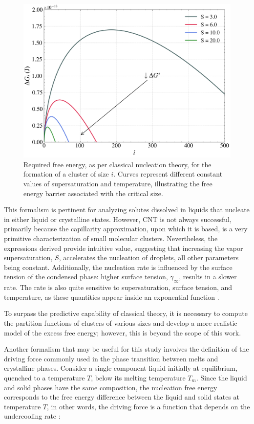 \begin{figure}[H]
    \centering
    \includegraphics[width=0.9\linewidth]{free_energy_illustrative_degree_saturation.png}
    \caption{Required free energy, as per classical nucleation theory, for the formation of a cluster of size \(i\). Curves represent different constant values of supersaturation and temperature, illustrating the free energy barrier associated with the critical size.}
    \label{fig:free_energy_illustrative_degree_saturation}
\end{figure}

This formalism is pertinent for analyzing solutes dissolved in liquids that nucleate in either liquid or crystalline states. However, CNT is not 
always successful, primarily because the capillarity approximation, upon which it is based, is a very primitive characterization of small molecular clusters. 
Nevertheless, the expressions derived provide intuitive value, suggesting that increasing the vapor supersaturation, \(S\), accelerates the nucleation of droplets, 
all other parameters being constant. Additionally, the nucleation rate is influenced by the surface tension of the condensed phase: higher surface 
tension, \(\gamma_{\infty}\), results in a slower rate. The rate is also quite sensitive to supersaturation, surface tension, and temperature, as 
these quantities appear inside an exponential function \cite{Ford}.

To surpass the predictive capability of classical theory, it is necessary to compute the partition functions of clusters of various sizes and develop 
a more realistic model of the excess free energy; however, this is beyond the scope of this work.

Another formalism that may be useful for this study involves the definition of the driving force commonly used in the phase transition between melts 
and crystalline phases. Consider a single-component liquid initially at equilibrium, quenched to a temperature \(T\), below its melting 
temperature \(T_m\). Since the liquid and solid phases have the same composition, the nucleation free energy corresponds to the free 
energy difference between the liquid and solid states at temperature \(T\), in other words, the driving force is a function that depends 
on the undercooling rate \cite{Clouet1, Fokin2006}:

